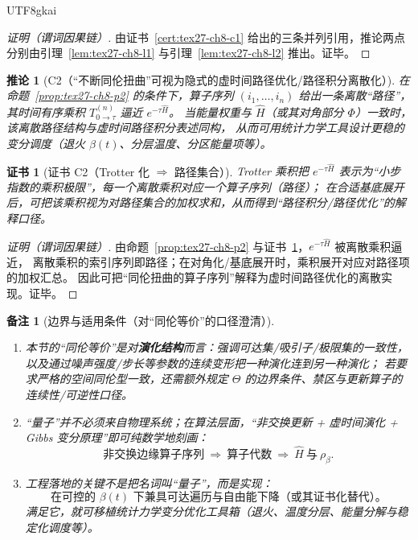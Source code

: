 \documentclass[12pt]{article}
\newtheorem{corollary}{推论}[section]
\newtheorem{remark}{备注}[section]
\newtheorem{Certificate}{证书}[section]
\begin{document}
\begin{CJK*}{UTF8}{gkai}
\begin{proof}[证明（谓词因果链）]
由证书~\ref{cert:tex27-ch8-c1} 给出的三条并列引用，推论两点分别由引理~\ref{lem:tex27-ch8-l1} 与引理~\ref{lem:tex27-ch8-l2} 推出。证毕。
\end{proof}

\begin{corollary}[C2（“不断同伦扭曲”可视为隐式的虚时间路径优化/路径积分离散化）]
\label{cor:tex27-ch8-c2}
在命题~\ref{prop:tex27-ch8-p2} 的条件下，算子序列 $(i_1,\dots,i_n)$ 给出一条离散“路径”，
其时间有序乘积 $T_{0\to\tau}^{(n)}$ 逼近 $e^{-\tau\widehat{H}}$。
当能量权重与 $\widehat{H}$（或其对角部分 $\Phi$）一致时，该离散路径结构与虚时间路径积分表述同构，
从而可用统计力学工具设计更稳的变分调度（退火 $\beta(t)$、分层温度、分区能量项等）。
\end{corollary}

\begin{Certificate}[证书 C2（Trotter 化 $\Rightarrow$ 路径集合）]
\label{cert:tex27-ch8-c2}
Trotter 乘积把 $e^{-\tau\widehat{H}}$ 表示为“小步指数的乘积极限”，每一个离散乘积对应一个算子序列（路径）；
在合适基底展开后，可把该乘积视为对路径集合的加权求和，从而得到“路径积分/路径优化”的解释口径。
\end{Certificate}

\begin{proof}[证明（谓词因果链）]
由命题~\ref{prop:tex27-ch8-p2} 与证书~\ref{cert:tex27-ch8-c2}，$e^{-\tau\widehat{H}}$ 被离散乘积逼近，
离散乘积的索引序列即路径；在对角化/基底展开时，乘积展开对应对路径项的加权汇总。
因此可把“同伦扭曲的算子序列”解释为虚时间路径优化的离散实现。证毕。
\end{proof}

\begin{remark}[边界与适用条件（对“同伦等价”的口径澄清）]
\label{rem:tex27-ch8-r1}
\begin{enumerate}
  \item 本节的“同伦等价”是对\textbf{演化结构}而言：强调可达集/吸引子/极限集的一致性，以及通过噪声强度/步长等参数的连续变形把一种演化连到另一种演化；
  若要求严格的空间同伦型一致，还需额外规定 $\Theta$ 的边界条件、禁区与更新算子的连续性/可逆性口径。
  \item “量子”并不必须来自物理系统；在算法层面，“非交换更新 + 虚时间演化 + Gibbs 变分原理”即可纯数学地刻画：
  \[
    \text{非交换边缘算子序列}\ \Longrightarrow\ \text{算子代数}\ \Longrightarrow\ \widehat{H}\ \text{与}\ \rho_\beta.
  \]
  \item 工程落地的关键不是把名词叫“量子”，而是实现：
  \[
    \text{在可控的 }\beta(t)\text{ 下兼具可达遍历与自由能下降（或其证书化替代）。}
  \]
  满足它，就可移植统计力学变分优化工具箱（退火、温度分层、能量分解与稳定化调度等）。
\end{enumerate}
\end{remark}


\end{CJK*}
\end{document}
